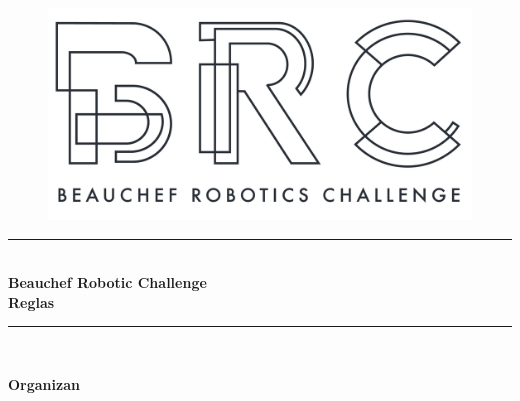 \begin{titlepage} %
  \newcommand{\HRule}{\rule{\linewidth}{0.5mm}} %
  
  \center %
  

  \begin{figure}
    \centering
    \includegraphics[width=0.5\linewidth]{./images/logos/BRC_SinFondo.png}
  \end{figure}

  
  \HRule\\[0.4cm]
  
  {\Huge\bfseries Beauchef Robotic Challenge}\\[0.4cm] %
  {\LARGE\bfseries Reglas}
  \HRule\\[1.5cm]
  
  
  \vfill\vfill

  {\Large\bfseries Organizan}


\end{titlepage}
